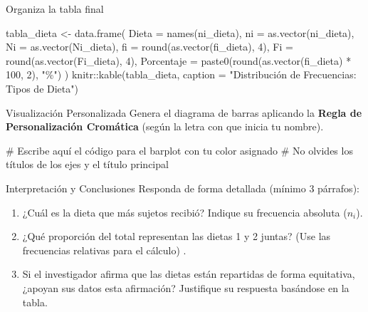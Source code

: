 \documentclass[
  ignorenonframetext,
  aspectratio=169,
  spanish,
]{beamer}
\newenvironment{Shaded}{\begin{snugshade}}{\end{snugshade}}
\newcommand{\AttributeTok}[1]{\textcolor[rgb]{0.40,0.45,0.13}{#1}}
\newcommand{\CommentTok}[1]{\textcolor[rgb]{0.37,0.37,0.37}{#1}}
\newcommand{\DecValTok}[1]{\textcolor[rgb]{0.68,0.00,0.00}{#1}}
\newcommand{\FunctionTok}[1]{\textcolor[rgb]{0.28,0.35,0.67}{#1}}
\newcommand{\NormalTok}[1]{\textcolor[rgb]{0.00,0.23,0.31}{#1}}
\newcommand{\OtherTok}[1]{\textcolor[rgb]{0.00,0.23,0.31}{#1}}
\newcommand{\SpecialCharTok}[1]{\textcolor[rgb]{0.37,0.37,0.37}{#1}}
\newcommand{\StringTok}[1]{\textcolor[rgb]{0.13,0.47,0.30}{#1}}
\begin{document}
\begin{frame}[fragile]{Organiza la tabla final}
\label{organiza-la-tabla-final}
\begin{Shaded}
\begin{Highlighting}[]
\NormalTok{tabla\_dieta }\OtherTok{\textless{}{-}} \FunctionTok{data.frame}\NormalTok{(}
  \AttributeTok{Dieta =} \FunctionTok{names}\NormalTok{(ni\_dieta),}
  \AttributeTok{ni =} \FunctionTok{as.vector}\NormalTok{(ni\_dieta),}
  \AttributeTok{Ni =} \FunctionTok{as.vector}\NormalTok{(Ni\_dieta),}
  \AttributeTok{fi =} \FunctionTok{round}\NormalTok{(}\FunctionTok{as.vector}\NormalTok{(fi\_dieta), }\DecValTok{4}\NormalTok{),}
  \AttributeTok{Fi =} \FunctionTok{round}\NormalTok{(}\FunctionTok{as.vector}\NormalTok{(Fi\_dieta), }\DecValTok{4}\NormalTok{),}
  \AttributeTok{Porcentaje =} \FunctionTok{paste0}\NormalTok{(}\FunctionTok{round}\NormalTok{(}\FunctionTok{as.vector}\NormalTok{(fi\_dieta) }\SpecialCharTok{*} \DecValTok{100}\NormalTok{, }\DecValTok{2}\NormalTok{), }\StringTok{"\%"}\NormalTok{)}
\NormalTok{)}
\NormalTok{knitr}\SpecialCharTok{::}\FunctionTok{kable}\NormalTok{(tabla\_dieta, }\AttributeTok{caption =} \StringTok{"Distribución de Frecuencias: Tipos de Dieta"}\NormalTok{)}
\end{Highlighting}
\end{Shaded}
\end{frame}

\begin{frame}[fragile]{Visualización Personalizada}
\label{visualizaciuxf3n-personalizada}
Genera el diagrama de barras aplicando la \textbf{Regla de
Personalización Cromática} (según la letra con que inicia tu nombre).

\begin{Shaded}
\begin{Highlighting}[]
\CommentTok{\# Escribe aquí el código para el barplot con tu color asignado}
\CommentTok{\# No olvides los títulos de los ejes y el título principal}
\end{Highlighting}
\end{Shaded}
\end{frame}

\begin{frame}{Interpretación y Conclusiones}
\label{interpretaciuxf3n-y-conclusiones}
Responda de forma detallada (mínimo 3 párrafos):

\begin{enumerate}
\item
  ¿Cuál es la dieta que más sujetos recibió? Indique su frecuencia
  absoluta (\(n_i\)).
\item
  ¿Qué proporción del total representan las dietas 1 y 2 juntas? (Use
  las frecuencias relativas para el cálculo) .
\item
  Si el investigador afirma que las dietas están repartidas de forma
  equitativa, ¿apoyan sus datos esta afirmación? Justifique su respuesta
  basándose en la tabla.
\end{enumerate}
\end{frame}
\end{document}

